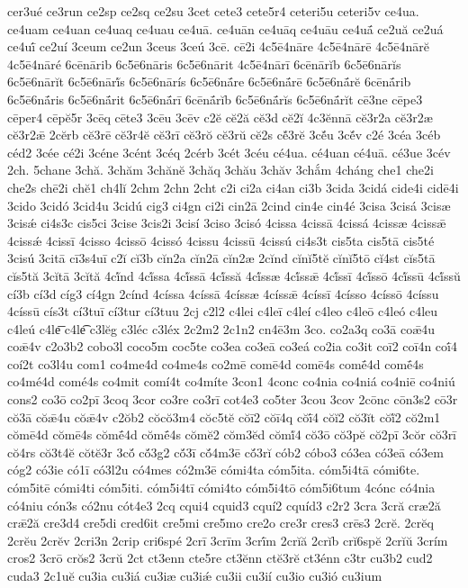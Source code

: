 {cer3ué
ce3run
ce2sp
ce2sq
ce2su
3cet
cete3
cete5r4
ceteri5u
ceteri5v
ce4ua.
ce4uam
ce4uan
ce4uaq
ce4uau
ce4uā.
ce4uān
ce4uāq
ce4uāu
ce4uā́
ce2uă
ce2uá
ce4uī́
ce2uí
3ceum
ce2un
3ceus
3ceú
3cē.
cē2i
4c5ē4nāre
4c5ē4nārē
4c5ē4nārĕ
4c5ē4nāré
6cēnārib
6c5ē6nāris
6c5ē6nārit
4c5ē4nārī
6cēnārĭb
6c5ē6nārĭs
6c5ē6nārĭt
6c5ē6nārĭ́s
6c5ē6nārís
6c5ē6nā́re
6c5ē6nā́rē
6c5ē6nā́rĕ
6cēnā́rib
6c5ē6nā́ris
6c5ē6nā́rit
6c5ē6nā́rī
6cēnā́rĭb
6c5ē6nā́rĭs
6c5ē6nā́rĭt
cē3ne
cēpe3
cēper4
cēpĕ5r
3cēq
cēte3
3cēu
3cēv
c2ĕ
cĕ2ă
cĕ3d
cĕ2ĭ
4c3ĕnnā
cĕ3r2a
cĕ3r2æ
cĕ3r2ǣ
2cĕrb
cĕ3rē
cĕ3r4ĕ
cĕ3rī
cĕ3rŏ
cĕ3rŭ
cĕ2s
cĕ́3rĕ
3cĕ́u
3cĕ́v
c2é
3céa
3céb
céd2
3cée
cé2i
3céne
3cént
3céq
2cérb
3cét
3céu
cé4ua.
cé4uan
cé4uā.
cé3ue
3cév
2ch.
5chane
3chă.
3chăm
3chănĕ
3chăq
3chău
3chăv
3chắm
4cháng
che1
che2i
che2s
chē2i
chĕ1
ch4lĭ
2chm
2chn
2cht
c2i
ci2a
ci4an
ci3b
3cida
3cidá
cide4i
cidē4i
3cido
3cidó
3cid4u
3cidú
cig3
ci4gn
ci2i
cin2ā
2cind
cin4e
cin4é
3cisa
3cisá
3cisæ
3cisǽ
ci4s3c
cis5ci
3cise
3cis2i
3cisí
3ciso
3cisó
4cissa
4cissā
4cissá
4cissæ
4cissǣ
4cissǽ
4cissī
4cisso
4cissō
4cissó
4cissu
4cissū
4cissú
ci4s3t
cis5ta
cis5tā
cis5té
3cisú
3citā
cī3s4uī
c2ĭ
cĭ3b
cĭn2a
cĭn2ā
cĭn2æ
2cĭnd
cĭnĭ5tĕ
cĭnĭ5tō
cĭ4st
cĭs5tā
cĭs5tă
3cĭtā
3cĭtă
4cĭ́nd
4cĭ́ssa
4cĭ́ssā
4cĭ́ssă
4cĭ́ssæ
4cĭ́ssǣ
4cĭ́ssī
4cĭ́ssō
4cĭ́ssū
4cĭ́ssŭ
cí3b
cí3d
cíg3
cí4gn
2cínd
4císsa
4císsā
4císsæ
4císsǣ
4císsī
4císso
4císsō
4císsu
4císsū
cís3t
cí3tuī
cí3tur
cí3tuu
2cj
c2l2
c4lei
c4leī
c4leí
c4leo
c4leō
c4leó
c4leu
c4leú
c4le͞
c4le͡
c3lĕg
c3léc
c3léx
2c2m2
2c1n2
cn4ē3m
3co.
co2a3q
co3ā
coǣ4u
coǣ4v
c2o3b2
cobo3l
coco5m
coc5te
co3ea
co3eā
co3eá
co2ia
co3it
coī2
coī4n
coī́4
coí2t
co3l4u
com1
co4me4d
co4me4s
co2mē
comē4d
comē4s
comḗ4d
comḗ4s
co4mé4d
comé4s
co4mit
comí4t
co4míte
3con1
4conc
co4nia
co4niá
co4niē
co4niú
cons2
co3ō
co2pī
3coq
3cor
co3re
co3rī
cot4e3
co5ter
3cou
3cov
2cōnc
cōn3s2
cō3r
cŏ3ā
cŏǣ4u
cŏǣ4v
c2ŏb2
cŏcŏ3m4
cŏc5tĕ
cŏī2
cŏī4q
cŏī́4
cŏĭ2
cŏ3ĭt
cŏĭ́2
cŏ2m1
cŏmē4d
cŏmē4s
cŏmḗ4d
cŏmḗ4s
cŏmĕ2
cŏm3ĕd
cŏmĭ́4
cŏ3ō
cŏ3pĕ
cŏ2pī
3cŏr
cŏ3rī
cŏ4rs
cŏ3t4ĕ
cŏtĕ3r
3cŏ́
cŏ́3g2
cŏ́3ī
cŏ́4m3ē
cŏ́3rĭ
cób2
cóbo3
có3ea
có3eā
có3em
cóg2
có3ie
có1ī
có3l2u
có4mes
có2m3ē
cómi4ta
cóm5ita.
cóm5i4tā
cómi6te.
cóm5itē
cómi4ti
cóm5iti.
cóm5i4tī
cómi4to
cóm5i4tō
cóm5i6tum
4cónc
có4nia
có4niu
cón3s
có2nu
cót4e3
2cq
cqui4
cquid3
cquí2
cquíd3
c2r2
3cra
3cră
cræ2ă
crǣ2ă
cre3d4
cre5di
cred6it
cre5mi
cre5mo
cre2o
cre3r
cres3
crēs3
2crĕ.
2crĕq
2crĕu
2crĕv
2cri3n
2crip
cri6spé
2crī
3crīm
3crī́m
2crĭă
2crĭb
crĭ6spĕ
2crĭŭ
3crím
cros2
3crō
crŏs2
3crŭ
2ct
ct3enn
cte5re
ct3ĕnn
ctĕ3rĕ
ct3énn
c3tr
cu3b2
cud2
cuda3
2c1uĕ
cu3ia
cu3iá
cu3iæ
cu3iǽ
cu3ii
cu3ií
cu3io
cu3ió
cu3ium
}
